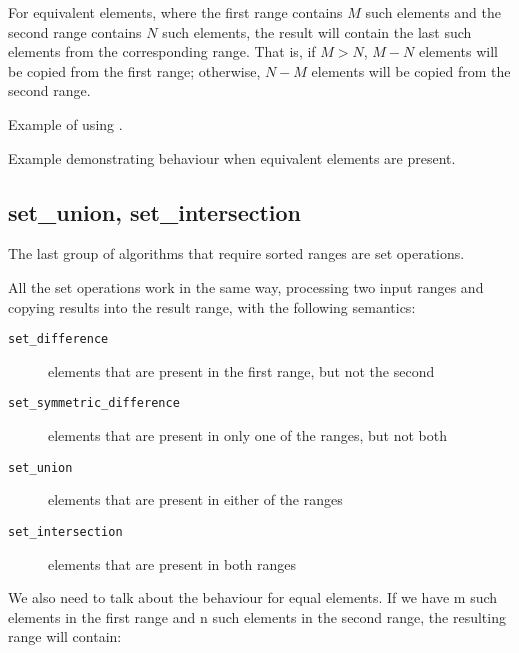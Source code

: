 For equivalent elements, where the first range contains $M$ such elements and the second range contains $N$ such elements, the result will contain the last  such elements from the corresponding range. That is, if $M>N$, $M-N$ elements will be copied from the first range; otherwise, $N-M$ elements will be copied from the second range.

\begin{box-note}
\footnotesize Example of using .
\tcblower
{}
\end{box-note}

\begin{box-note}
\footnotesize Example demonstrating  behaviour when equivalent elements are present.
\tcblower
{}
\end{box-note}

\subsection{set\_union, set\_intersection}

The last group of algorithms that require sorted ranges are set operations.




All the set operations work in the same way, processing two input ranges and copying results into the result range, with the following semantics:

\begin{description}
   \item[\texttt{set\_difference}] elements that are present in the first range, but not the second
   \item[\texttt{set\_symmetric\_difference}] elements that are present in only one of the ranges, but not both
   \item[\texttt{set\_union}] elements that are present in either of the ranges
   \item[\texttt{set\_intersection}] elements that are present in both ranges
\end{description}

We also need to talk about the behaviour for equal elements. If we have m such elements in the first range and n such elements in the second range, the resulting range will contain:


